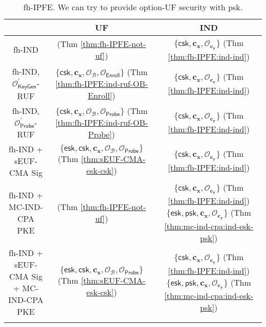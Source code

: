 \begin{table}[ht]
\centering
\begin{tabular}{c c c} 
	
	\toprule

	& \textbf{UF} & \textbf{IND} \\
	
	\midrule

	\textsf{fh-IND} & \xmark \; (Thm \ref{thm:fh-IPFE-not-uf}) & $\{ \textsf{csk}, \mathbf{c_x},  \mathcal{O}_{\mathbf{c_y}} \}$ (Thm \ref{thm:fh-IPFE:ind-ind}) \\
	
	\midrule
	
	\textsf{fh-IND}, $\mathcal{O}^\prime_{\textsf{KeyGen}}$-RUF & $\{ \textsf{csk}, \mathbf{c_x}, \mathcal{O}_\mathcal{B}, \mathcal{O}_{\textsf{Enroll}} \}$ (Thm \ref{thm:fh-IPFE:ind-ruf-OB-Enroll}) & $\{ \textsf{csk}, \mathbf{c_x},  \mathcal{O}_{\mathbf{c_y}} \}$ (Thm \ref{thm:fh-IPFE:ind-ind}) \\
	
	\midrule
	
	\textsf{fh-IND}, $\mathcal{O}^\prime_{\textsf{Probe}}$-RUF & $\{ \textsf{csk}, \mathbf{c_x}, \mathcal{O}_\mathcal{B}, \mathcal{O}_{\textsf{Probe}} \}$ (Thm \ref{thm:fh-IPFE:ind-ruf-OB-Probe}) & $\{ \textsf{csk}, \mathbf{c_x},  \mathcal{O}_{\mathbf{c_y}} \}$ (Thm \ref{thm:fh-IPFE:ind-ind}) \\
	
	\midrule
	
	\textsf{fh-IND} + sEUF-CMA \textsf{Sig} & $\{ \textsf{esk}, \textsf{csk}, \mathbf{c_x}, \mathcal{O}_\mathcal{B}, \mathcal{O}_{\textsf{Probe}} \}$ (Thm \ref{thm:sEUF-CMA-esk-csk}) & $\{ \textsf{csk}, \mathbf{c_x},  \mathcal{O}_{\mathbf{c_y}} \}$ (Thm \ref{thm:fh-IPFE:ind-ind}) \\
	
	\midrule
	
	\textsf{fh-IND} + MC-IND-CPA \textsf{PKE} & \xmark \; (Thm \ref{thm:fh-IPFE-not-uf})  & \makecell{$\{ \textsf{csk}, \mathbf{c_x},  \mathcal{O}_{\mathbf{c_y}} \}$ (Thm \ref{thm:fh-IPFE:ind-ind}) \\ $\{ \textsf{esk}, \textsf{psk}, \mathbf{c_x}, \mathcal{O}_{\mathbf{c_y}} \}$ (Thm \ref{thm:mc-ind-cpa:ind-esk-psk})} \\
	
	\midrule
	
	\makecell{\textsf{fh-IND} + sEUF-CMA \textsf{Sig} \\ + MC-IND-CPA \textsf{PKE}} & $\{ \textsf{esk}, \textsf{csk}, \mathbf{c_x}, \mathcal{O}_\mathcal{B}, \mathcal{O}_{\textsf{Probe}} \}$ (Thm \ref{thm:sEUF-CMA-esk-csk}) & \makecell{$\{ \textsf{csk}, \mathbf{c_x},  \mathcal{O}_{\mathbf{c_y}} \}$ (Thm \ref{thm:fh-IPFE:ind-ind}) \\ $\{ \textsf{esk}, \textsf{psk}, \mathbf{c_x}, \mathcal{O}_{\mathbf{c_y}} \}$ (Thm \ref{thm:mc-ind-cpa:ind-esk-psk})} \\
	
	\bottomrule

\medskip
\end{tabular}
\caption{fh-IPFE. We can try to provide \textsf{option}-UF security with \textsf{psk}.}
\label{table:fh-IPFE}
\end{table}
